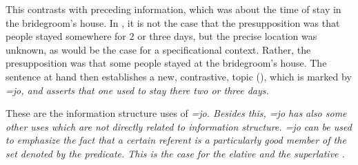 This contrasts with preceding information, which was about the time of stay in the bridegroom's house. In , it is not the case that the presupposition was that people stayed somewhere for 2 or three days, but the precise location was unknown, as would be the case for a specificational context. Rather, the presupposition was that some people stayed at the bridegroom's house. The sentence at hand then establishes a new, contrastive,  topic (), which is marked by \em =jo\em, and asserts that one used to stay there two or three days.


% 
% 
These are the information structure uses of \em =jo\em. Besides this, \em =jo \em has also some other uses which are not directly related to information structure. \em =jo \em can be used to emphasize the fact that a certain referent is a particularly good member of the set denoted by the predicate. This is the case for the elative  and the superlative .

\\ 

\\ 

